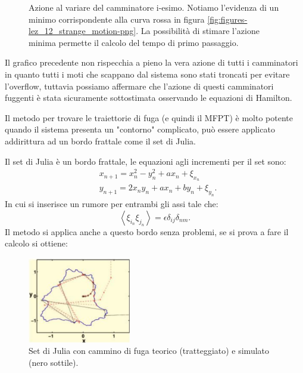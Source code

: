\begin{exmp}[]
\begin{figure}[H]
	\caption{\scriptsize Azione al variare del camminatore i-esimo. Notiamo l'evidenza di un minimo corrispondente alla curva rossa in figura \ref{fig:figures-lez_12_strange_motion-png}. La possibilità di stimare l'azione minima permette il calcolo del tempo di primo passaggio.}
        \label{fig:figures-lez_12_strange_motion_action-png}
    \end{figure}
    \noindent 
    Il grafico precedente non rispecchia a pieno la vera azione di tutti i camminatori in quanto tutti i moti che scappano dal sistema sono stati troncati per evitare l'overflow, tuttavia possiamo affermare che l'azione di questi camminatori fuggenti è stata sicuramente sottostimata osservando le equazioni di Hamilton.
\end{exmp}
\noindent
Il metodo per trovare le traiettorie di fuga (e quindi il MFPT) è molto potente quando il sistema presenta un "contorno" complicato, può essere applicato addirittura ad un bordo frattale come il set di Julia.
\begin{ex}
    Il set di Julia è un bordo frattale, le equazioni agli incrementi per il set sono:
    \[\begin{aligned}
	&x_{n+1} = x^2_n - y^2_n + ax_n + \xi_{x_n}\\
	& y_{n+1}= 2x_ny_n + ax_n + by_n + \xi_{y_n}
    .\end{aligned}\]
    In cui si inserisce un rumore per entrambi gli assi tale che:
    \[
        \left<\xi_{i_n}\xi_{j_n}\right> = \epsilon\delta_{ij}\delta_{nm}
    .\] 
    Il metodo si applica anche a questo bordo senza problemi, se si prova a fare il calcolo si ottiene:
    \begin{figure}[H]
        \centering
	\includegraphics[width=0.4\textwidth]{figures/lez_12_Julia_set.png}
	\caption{\scriptsize Set di Julia con cammino di fuga teorico (tratteggiato) e simulato (nero sottile).}
        \label{fig:figures-lez_12_Julia_set-png}
    \end{figure}
    \noindent
\end{ex}
\noindent
